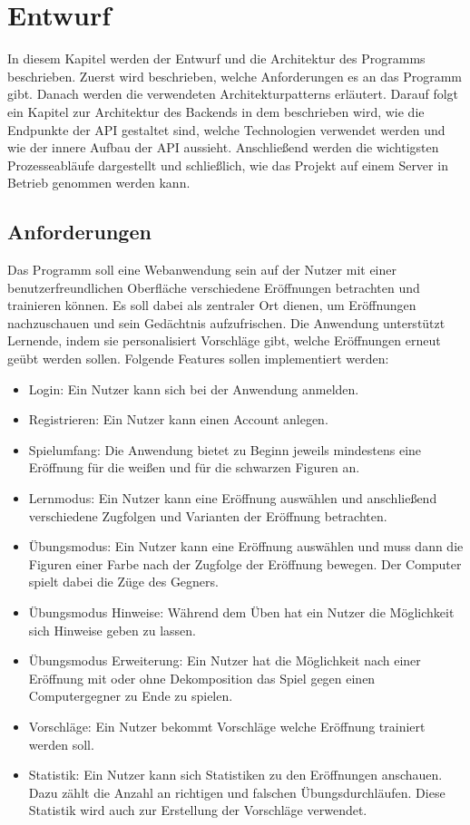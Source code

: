 
\chapter{Entwurf} %
In diesem Kapitel werden der Entwurf und die Architektur des Programms beschrieben. Zuerst wird beschrieben, welche Anforderungen es an das Programm gibt. Danach werden die verwendeten Architekturpatterns erläutert. Darauf folgt ein Kapitel zur Architektur des Backends in dem beschrieben wird, wie die Endpunkte der API gestaltet sind, welche Technologien verwendet werden und wie der innere Aufbau der API aussieht. Anschließend werden die wichtigsten Prozesseabläufe dargestellt und schließlich, wie das Projekt auf einem Server in Betrieb genommen werden kann.

\section{Anforderungen}
Das Programm soll eine Webanwendung sein auf der Nutzer mit einer benutzerfreundlichen Oberfläche verschiedene Eröffnungen betrachten und trainieren können. Es soll dabei als zentraler Ort dienen, um Eröffnungen nachzuschauen und sein Gedächtnis aufzufrischen. Die Anwendung unterstützt Lernende, indem sie personalisiert Vorschläge gibt, welche Eröffnungen erneut geübt werden sollen. Folgende Features sollen implementiert werden:

\begin{itemize}
    \item Login: Ein Nutzer kann sich bei der Anwendung anmelden.
    \item Registrieren: Ein Nutzer kann einen Account anlegen.
    \item Spielumfang: Die Anwendung bietet zu Beginn jeweils mindestens eine Eröffnung für die weißen und für die schwarzen Figuren an.
    \item Lernmodus: Ein Nutzer kann eine Eröffnung auswählen und anschließend verschiedene Zugfolgen und Varianten der Eröffnung betrachten.
    \item Übungsmodus: Ein Nutzer kann eine Eröffnung auswählen und muss dann die Figuren einer Farbe nach der Zugfolge der Eröffnung bewegen. Der Computer spielt dabei die Züge des Gegners.
    \item Übungsmodus Hinweise: Während dem Üben hat ein Nutzer die Möglichkeit sich Hinweise geben zu lassen.
    \item Übungsmodus Erweiterung: Ein Nutzer hat die Möglichkeit nach einer Eröffnung mit oder ohne Dekomposition das Spiel gegen einen Computergegner zu Ende zu spielen.
    \item Vorschläge: Ein Nutzer bekommt Vorschläge welche Eröffnung trainiert werden soll.
    \item Statistik: Ein Nutzer kann sich Statistiken zu den Eröffnungen anschauen. Dazu zählt die Anzahl an richtigen und falschen Übungsdurchläufen. Diese Statistik wird auch zur Erstellung der Vorschläge verwendet.
\end{itemize}

